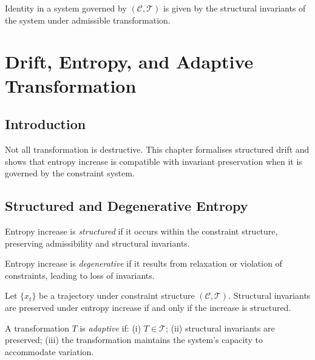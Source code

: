 \documentclass[11pt,openany]{book}
\begin{document}
\begin{proposition}
\label{prop:identity}
Identity in a system governed by $(\mathcal{C},
\mathcal{T})$ is given by the structural invariants of the
system under admissible transformation.
\end{proposition}


\chapter{Drift, Entropy, and Adaptive Transformation}
\label{ch:drift}

\section{Introduction}
\label{sec:introduction-drift}

Not all transformation is destructive. This chapter
formalises structured drift and shows that entropy increase
is compatible with invariant preservation when it is
governed by the constraint system.

\section{Structured and Degenerative Entropy}
\label{sec:structured-entropy}

\begin{definition}
Entropy increase is \emph{structured} if it occurs within
the constraint structure, preserving admissibility and
structural invariants.
\end{definition}

\begin{definition}
Entropy increase is \emph{degenerative} if it results from
relaxation or violation of constraints, leading to loss of
invariants.
\end{definition}

\begin{theorem}
\label{thm:entropy}
Let $\{x_t\}$ be a trajectory under constraint structure
$(\mathcal{C}, \mathcal{T})$. Structural invariants are
preserved under entropy increase if and only if the
increase is structured.
\end{theorem}

\begin{definition}
\label{def:adaptive}
A transformation $T$ is \emph{adaptive} if: (i) $T \in
\mathcal{T}$; (ii) structural invariants are preserved;
(iii) the transformation maintains the system's capacity
to accommodate variation.
\end{definition}
\end{document}
